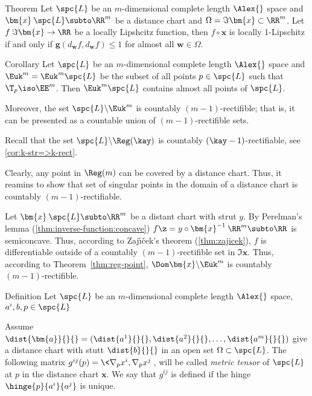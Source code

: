 \begin{thm}{Theorem}
Let $\spc{L}$ be an $m$-dimensional complete length $\Alex{}$ space and $\bm{x}\:\spc{L}\subto\RR^m$ be a distance chart and $\Omega=\Im\bm{x}\subset\RR^m$. 
Let $f\:\Im\bm{x}\to\RR$ be a locally Lipshcitz function,
then $f\circ\bm{x}$ is locally 1-Lipschitz if and only if
$\bm{g}(d_{\bm{w}}f,d_{\bm{w}}f)\le 1$ for almost all $\bm{w}\in\Omega$.
\end{thm}




\begin{thm}{Corollary}
Let $\spc{L}$ be an $m$-dimensional complete length $\Alex{}$ space and $\Euk^m=\Euk^m\spc{L}$ be the subset of all points $p\in \spc{L}$ such that $\T_p\iso\EE^m$. 
Then $\Euk^m\spc{L}$ contains almost all points of $\spc{L}$.

Moreover, the set 
$\spc{L}\backslash\Euk^m$ is countably $(m-1)$-rectifible;
that is, it can be presented as a countable union of $(m-1)$-rectifible sets.
\end{thm}

Recall that the set $\spc{L}\backslash\Reg(\kay)$ is countably $(\kay-1)$-rectifiable, see \ref{cor:k-str=>k-rect}.

Clearly, any point in $\Reg(m)$ can be covered by a distance chart. 
Thus, it reamins to show that set of singular points in the domain of a distance chart is countably $(m-1)$-rectifiable.

Let $\bm{x}\:\spc{L}\subto\RR^m$ be a distant chart with strut $y$.
By Perelman's lemma (\ref{thm:inverse-function:concave}) $f\z=y\circ\bm{x}^{-1}\:\RR^m\subto \RR$ is semiconcave.
Thus, according to Zaj\'{\i}\v{c}ek's theorem (\ref{thm:zajicek}),
$f$ is differentiable outside of a countably $(m-1)$-rectifible set in $\Im \bm{x}$.
Thus, according to Theorem~\ref{thm:reg-point}, 
$\Dom\bm{x}\backslash\Euk^m$ is countably $(m-1)$-rectifible.
\qeds



\begin{thm}{Definition}
Let $\spc{L}$ be an $m$-dimensional complete length $\Alex{}$ space, $a^i,b,p\in\spc{L}$

Assume $\dist{\bm{a}}{}{}=(\dist{a^1}{}{},\dist{a^2}{}{},\dots,\dist{a^m}{}{})$ 
give a distance chart with stutt $\dist{b}{}{}$
in an open set $\Omega\subset\spc{L}$.
The following matrix 
$g^{ij}(p)=\<\nabla_p x^i,\nabla_p x^j\>$,
will be called \emph{metric tensor} of $\spc{L}$
at $p$ in the distance chart $\bm{x}$.
We say that $g^{ij}$ is defined if the hinge $\hinge{p}{a^i}{a^j}$ is unique.
\end{thm}


